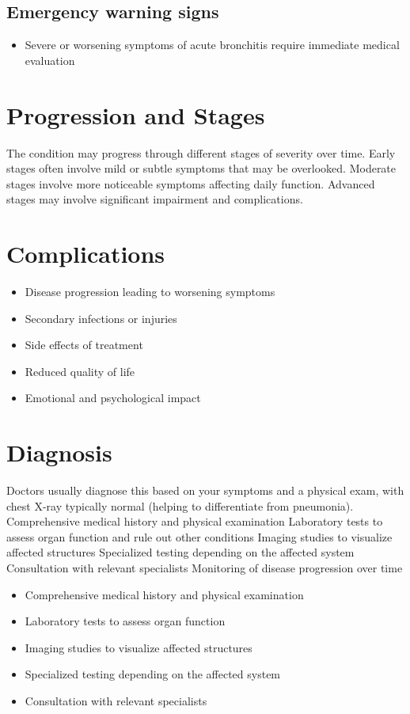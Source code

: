 \subsection{Emergency warning signs}
\begin{itemize}[noitemsep]
  \item Severe or worsening symptoms of acute bronchitis require immediate medical evaluation
\end{itemize}
\section{Progression and Stages}
The condition may progress through different stages of severity over time. Early stages often involve mild or subtle symptoms that may be overlooked. Moderate stages involve more noticeable symptoms affecting daily function. Advanced stages may involve significant impairment and complications.
\section{Complications}
\begin{itemize}[noitemsep]
  \item Disease progression leading to worsening symptoms
  \item Secondary infections or injuries
  \item Side effects of treatment
  \item Reduced quality of life
  \item Emotional and psychological impact
\end{itemize}
\section{Diagnosis}
Doctors usually diagnose this based on your symptoms and a physical exam, with chest X-ray typically normal (helping to differentiate from pneumonia). Comprehensive medical history and physical examination Laboratory tests to assess organ function and rule out other conditions Imaging studies to visualize affected structures Specialized testing depending on the affected system Consultation with relevant specialists Monitoring of disease progression over time

\begin{itemize}[noitemsep]
  \item Comprehensive medical history and physical examination
  \item Laboratory tests to assess organ function
  \item Imaging studies to visualize affected structures
  \item Specialized testing depending on the affected system
  \item Consultation with relevant specialists
\end{itemize}
